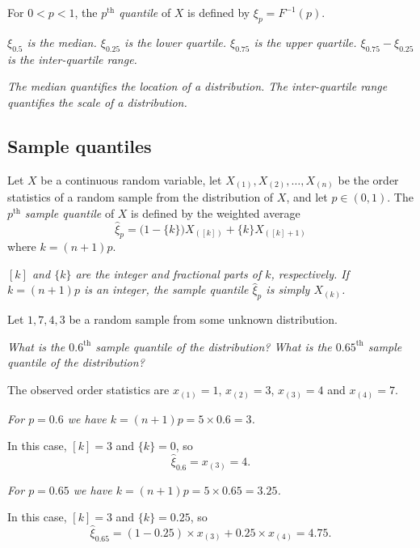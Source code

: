 \begin{definition}
For $0<p<1$, the \emph{$p^{\text{th}}$ quantile} of $X$ is defined by $\xi_p = F^{-1}(p)$.
\end{definition}

\begin{hidebox}
\bit
\it $\xi_{0.5}$ is the \emph{median}.
\it $\xi_{0.25}$ is the \emph{lower quartile}.
\it $\xi_{0.75}$ is the \emph{upper quartile}.
\it $\xi_{0.75}-\xi_{0.25}$ is the \emph{inter-quartile range}.
\eit
\end{hidebox}

%

\begin{remark}
\bit
\it The median quantifies the \emph{location} of a distribution.
\it The inter-quartile range quantifies the \emph{scale} of a distribution.
\eit
\end{remark}

\subsection{Sample quantiles}
\begin{definition}
Let $X$ be a continuous random variable, let $X_{(1)},X_{(2)},\ldots,X_{(n)}$ be the order statistics of a random sample from the distribution of $X$, and let $p\in(0,1)$. The $p^{\text{th}}$ \emph{sample quantile} of $X$ is defined by the weighted average
\[
\hat{\xi}_p = \big(1-\{k\}\big)X_{([k])} + \{k\}X_{([k]+1)}
\]
where $k=(n+1)p$.
\end{definition}

\begin{remark}
\bit
\it $[k]$ and $\{k\}$ are the integer and fractional parts of $k$, respectively.
\it If $k=(n+1)p$ is an integer, the sample quantile $\hat{\xi}_p$ is simply $X_{(k)}$.
\eit
\end{remark}


\begin{example}
Let $1,7,4,3$ be a random sample from some unknown distribution. 

\ben
\it What is the $0.6^{\text{th}}$ sample quantile of the distribution?
\it What is the $0.65^{\text{th}}$ sample quantile of the distribution?
\een
\end{example}

\begin{solution}
The observed order statistics are $x_{(1)}=1$, $x_{(2)}=3$, $x_{(3)}=4$ and $x_{(4)}=7$.

\ben
\it 
For $p=0.6$ we have $k=(n+1)p = 5\times 0.6 = 3$. 
\par
In this case, $[k]=3$ and $\{k\}=0$, so 
\[
\hat{\xi}_{0.6} = x_{(3)} = 4.
\]

\it
For $p=0.65$ we have $k=(n+1)p = 5\times 0.65 = 3.25$. 
\par
In this case, $[k]=3$ and $\{k\}=0.25$, so 
\[
\hat{\xi}_{0.65} = (1-0.25)\times x_{(3)} + 0.25\times x_{(4)} = 4.75.
\]
\een
\end{solution}

